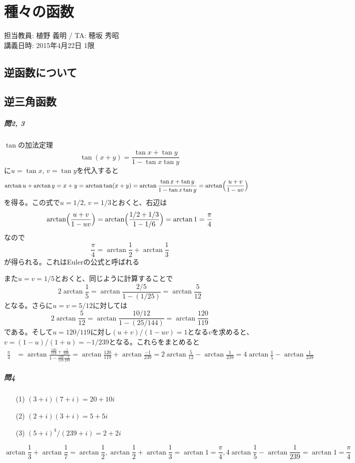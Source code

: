 \chapter{種々の函数}

\begin{flushright}
担当教員: 植野 義明 / TA: 穂坂 秀昭 \\
講義日時: 2015年4月22日 1限
\end{flushright}

\section{逆函数について}

\section{逆三角函数}

\paragraph{問2, 3} $\tan$の加法定理
\[
\tan(x+y) = \frac{\tan x + \tan y}{1 - \tan x\tan y}
\]
に$u=\tan x$, $v=\tan y$を代入すると
\begin{align*}
\arctan u + \arctan y
&= x + y = \arctan \tan(x+y)
= \arctan \frac{\tan x + \tan y}{1 - \tan x\tan y}
= \arctan \Bigl(\frac{u+v}{1-uv}\Bigr)
\end{align*}
を得る。この式で$u=1/2$, $v=1/3$とおくと、右辺は
\[
\arctan \Bigl(\frac{u+v}{1-uv}\Bigr) = \arctan \Bigl(\frac{1/2+1/3}{1-1/6}\Bigr) = \arctan 1 = \frac{\pi}{4}
\]
なので
\[
\frac{\pi}{4} = \arctan \frac{1}{2} + \arctan \frac{1}{3}
\]
が得られる。これはEulerの公式と呼ばれる

また$u=v=1/5$とおくと、同じように計算することで
\[
2\arctan\frac{1}{5} = \arctan\frac{2/5}{1-(1/25)} = \arctan\frac{5}{12}
\]
となる。さらに$u=v=5/12$に対しては
\[
2\arctan\frac{5}{12} = \arctan\frac{10/12}{1-(25/144)} = \arctan\frac{120}{119}
\]
である。そして$u=120/119$に対し$(u+v)/(1-uv)=1$となる$v$を求めると、$v=(1-u)/(1+u)=-1/239$となる。これらをまとめると
\begin{align*}
\frac{\pi}{4}
&= \arctan \frac{\frac{120}{119}+\frac{-1}{239}}{1-\frac{120}{119}\frac{-1}{239}}
= \arctan \frac{120}{119} + \arctan\frac{-1}{239}
= 2\arctan\frac{5}{12} - \arctan\frac{1}{239}
= 4\arctan\frac{1}{5} - \arctan\frac{1}{239}
\end{align*}

\paragraph{問4}
\begin{enumerate}
\item[(1)] $(3+i)(7+i) = 20+10i$
\item[(2)] $(2+i)(3+i) = 5+5i$
\item[(3)] $(5+i)^4/(239+i) = 2+2i$
\end{enumerate}
\[
\arctan\frac{1}{3} + \arctan\frac{1}{7} = \arctan\frac{1}{2},
\arctan\frac{1}{2} + \arctan\frac{1}{3} = \arctan{1} = \frac{\pi}{4},
4\arctan\frac{1}{5} - \arctan\frac{1}{239} = \arctan{1} = \frac{\pi}{4}
\]

